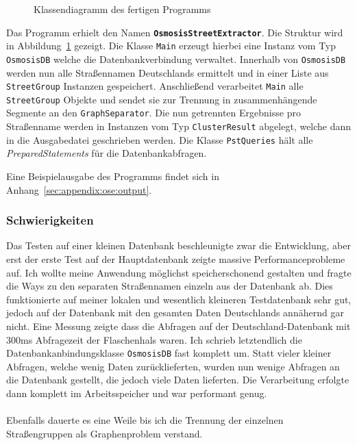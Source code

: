 \begin{figure}[htb]
   \centering
   \caption{Klassendiagramm des fertigen Programms}
   \label{fig:ose:uml}
 \end{figure}

Das Programm erhielt den Namen \textbf{\texttt{OsmosisStreetExtractor}}. Die Struktur wird in Abbildung~\ref{fig:ose:uml} gezeigt.
Die Klasse \texttt{Main} erzeugt hierbei eine Instanz vom Typ \texttt{OsmosisDB} welche die Datenbankverbindung verwaltet.
Innerhalb von \texttt{OsmosisDB} werden nun alle Straßennamen Deutschlands ermittelt und in einer Liste aus \texttt{StreetGroup} Instanzen gespeichert.
Anschließend verarbeitet \texttt{Main} alle \texttt{StreetGroup} Objekte und sendet sie zur Trennung in zusammenhängende Segmente an den \texttt{GraphSeparator}.
Die nun getrennten Ergebnisse pro Straßenname werden in Instanzen vom Typ \texttt{ClusterResult} abgelegt, welche dann in die Ausgabedatei geschrieben werden.
Die Klasse \texttt{PstQueries} hält alle \textit{PreparedStatements} für die Datenbankabfragen.

Eine Beispielausgabe des Programms findet sich in Anhang~\ref{sec:appendix:ose:output}.

\subsubsection{Schwierigkeiten}
Das Testen auf einer kleinen Datenbank beschleunigte zwar die Entwicklung, aber erst der erste Test auf der Hauptdatenbank zeigte massive Performanceprobleme auf.
Ich wollte meine Anwendung möglichst speicherschonend gestalten und fragte die Ways zu den separaten Straßennamen  einzeln aus der Datenbank ab.
Dies funktionierte auf meiner lokalen und wesentlich kleineren Testdatenbank sehr gut, jedoch auf der Datenbank mit den gesamten Daten Deutschlands annähernd gar nicht.
Eine Messung zeigte dass die Abfragen auf der Deutschland-Datenbank mit 300ms Abfragezeit der Flaschenhals waren.
Ich schrieb letztendlich die Datenbankanbindungsklasse \texttt{OsmosisDB} fast komplett um.
Statt vieler kleiner Abfragen, welche wenig Daten zurücklieferten, wurden nun wenige Abfragen an die Datenbank gestellt, die jedoch viele Daten lieferten.
Die Verarbeitung erfolgte dann komplett im Arbeitsspeicher und war performant genug.\\\\
Ebenfalls dauerte es eine Weile bis ich die Trennung der einzelnen Straßengruppen als Graphenproblem verstand.

